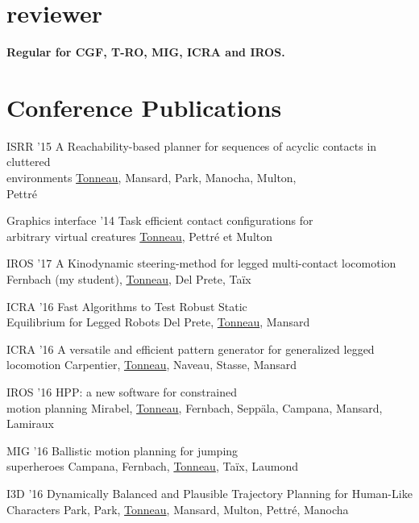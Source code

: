 \documentclass{tccv}
\begin{document}
\section{reviewer}
\textbf{Regular for CGF, T-RO, MIG, ICRA and IROS.}


\section{Conference Publications}
\begin{eventlist}

\item{ISRR '15}
{A Reachability-based planner for sequences
of acyclic contacts in cluttered\\ environments}
{\underline{Tonneau}, Mansard, Park, Manocha, Multon,\\ Pettr\'e}

\item
 {Graphics interface '14}
 {Task efficient contact configurations for\\
arbitrary virtual creatures}
 {\underline{Tonneau}, Pettr\'e et Multon} 

\item{IROS '17}
{ A Kinodynamic steering-method for legged multi-contact locomotion}
{Fernbach (my student), \underline{Tonneau}, Del Prete, Ta\"ix}

\item{ICRA '16}
{Fast Algorithms to Test Robust Static \\Equilibrium for Legged Robots}
{Del Prete, \underline{Tonneau},  Mansard}

\item{ICRA '16}
{A versatile and efficient pattern generator for generalized legged locomotion}
{Carpentier, \underline{Tonneau}, Naveau, Stasse,  Mansard}


\item{IROS '16}
{HPP: a new software for constrained \\motion planning }
{Mirabel, \underline{Tonneau}, Fernbach, Sepp\"ala, Campana, Mansard, Lamiraux}

\item{MIG '16}
{Ballistic motion planning for jumping\\ superheroes}
{Campana, Fernbach, \underline{Tonneau}, Ta\"ix, Laumond}


\item{I3D '16}
{Dynamically Balanced and Plausible Trajectory Planning for Human-Like Characters }
{Park, Park, \underline{Tonneau}, Mansard, Multon, Pettr\'e, Manocha}



\end{eventlist}
\end{document}
